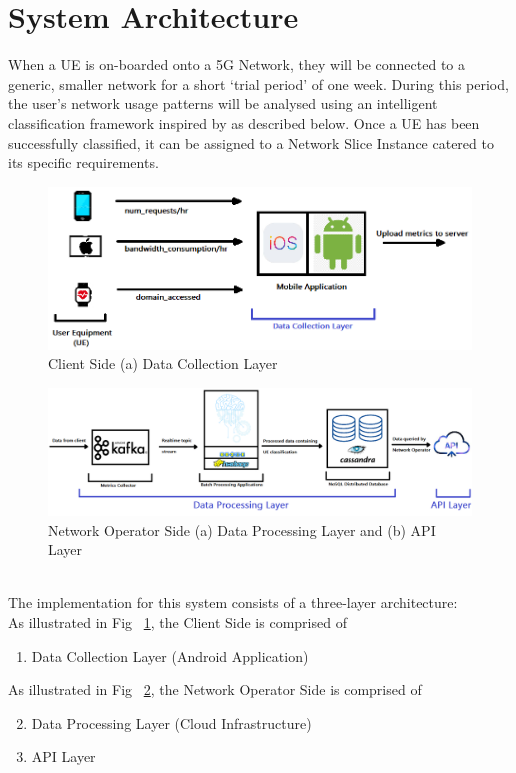 \documentclass[conference]{IEEEtran}
\begin{document}
\section{System Architecture}
When a UE is on-boarded onto a 5G Network, they will be connected to a generic, smaller network for a short ‘trial period’ of one week. During this period, the user’s network usage patterns will be analysed using an intelligent classification framework inspired by \cite{b2} as described below. Once a UE has been successfully classified, it can be assigned to a Network Slice Instance catered to its specific requirements.
\begin{figure}[htbp]
\centerline{\includegraphics[scale=0.7]{fig1.png}}
\caption{Client Side (a) Data Collection Layer}
\label{dclayer}
\end{figure}
\begin{figure}[htbp]
\centerline{\includegraphics[scale=0.4]{fig2.png}}
\caption{Network Operator Side (a) Data Processing Layer and (b) API Layer}
\label{prlayer}
\end{figure}
\\
The implementation for this system consists of a three-layer architecture:
\\
As illustrated in Fig ~\ref{dclayer}, the Client Side is comprised of
\begin{enumerate}
\item Data Collection Layer (Android Application)
\end{enumerate}
As illustrated in Fig ~\ref{prlayer}, the Network Operator Side is comprised of
\begin{enumerate}
\setcounter{enumi}{1}
\item Data Processing Layer (Cloud Infrastructure)
\item API Layer
\end{enumerate}
\end{document}
